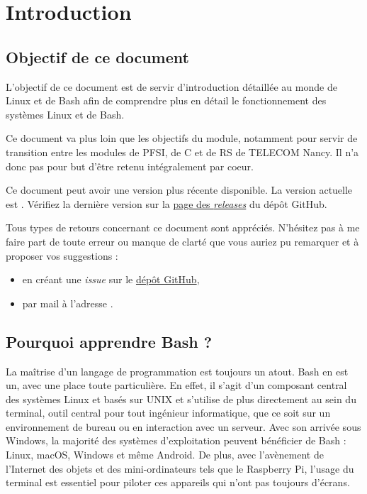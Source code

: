 \section*{Introduction}

\subsection*{Objectif de ce document}
L'objectif de ce document est de servir d'introduction détaillée au monde de Linux et de Bash afin de comprendre plus en détail le fonctionnement des systèmes Linux et de Bash.

Ce document va plus loin que les objectifs du module, notamment pour servir de transition entre les modules de PFSI, de C et de RS de TELECOM Nancy. Il n'a donc pas pour but d'être retenu intégralement par coeur.

 Ce document peut avoir une version plus récente disponible. La version actuelle est \textbf{\Version}. Vérifiez la dernière version sur la  \href{https://github.com/bsegault/linux-shell/releases}{page des \textit{releases}} du dépôt GitHub.

 Tous types de retours concernant ce document sont appréciés. N'hésitez pas à me faire part de toute erreur ou manque de clarté que vous auriez pu remarquer et à proposer vos suggestions :
\begin{itemize}
    \item en créant une \textit{issue} sur le \href{https://github.com/bsegault/linux-shell}{dépôt GitHub},
    \item par mail à l'adresse .
\end{itemize}


\subsection*{Pourquoi apprendre Bash ?}

La maîtrise d'un langage de programmation est toujours un atout. Bash en est un, avec une place toute particulière. En effet, il s'agit d'un composant central des systèmes Linux et basés sur UNIX et s'utilise de plus directement au sein du terminal, outil central pour tout ingénieur informatique, que ce soit sur un environnement de bureau ou en interaction avec un serveur. \newline
Avec son arrivée sous Windows, la majorité des systèmes d'exploitation peuvent bénéficier de Bash : Linux, macOS, Windows et même Android. De plus, avec l'avènement de l'Internet des objets et des mini-ordinateurs tels que le Raspberry Pi, l'usage du terminal est essentiel pour piloter ces appareils qui n'ont pas toujours d'écrans.

